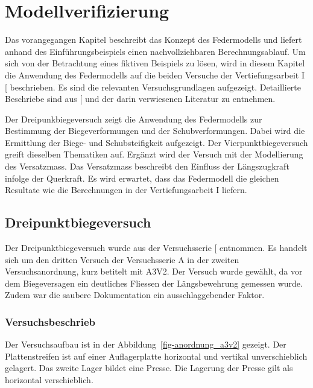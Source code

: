 \documentclass[
  11pt,
  letterpaper,
]{scrreprt}
\begin{document}

\chapter{Modellverifizierung}\label{sec-verifizierung}

Das vorangegangen Kapitel beschreibt das Konzept des Federmodells und
liefert anhand des Einführungsbeispiels einen nachvollziehbaren
Berechnungsablauf. Um sich von der Betrachtung eines fiktiven Beispiels
zu lösen, wird in diesem Kapitel die Anwendung des Federmodells auf die
beiden Versuche der Vertiefungsarbeit I
{[}\citeproc{ref-gitz_ansatze_2024}{1}{]} beschrieben. Es sind die
relevanten Versuchsgrundlagen aufgezeigt. Detaillierte Beschriebe sind
aus {[}\citeproc{ref-gitz_ansatze_2024}{1}{]} und der darin verwiesenen
Literatur zu entnehmen.

Der Dreipunkbiegeversuch zeigt die Anwendung des Federmodells zur
Bestimmung der Biegeverformungen und der Schubverformungen. Dabei wird
die Ermittlung der Biege- und Schubsteifigkeit aufgezeigt. Der
Vierpunktbiegeversuch greift dieselben Thematiken auf. Ergänzt wird der
Versuch mit der Modellierung des Versatzmass. Das Versatzmass beschreibt
den Einfluss der Längszugkraft infolge der Querkraft. Es wird erwartet,
dass das Federmodell die gleichen Resultate wie die Berechnungen in der
Vertiefungsarbeit I liefern.

\section{Dreipunktbiegeversuch}\label{dreipunktbiegeversuch}

Der Dreipunktbiegeversuch wurde aus der Versuchsserie
{[}\citeproc{ref-jager_versuche_2006}{2}{]} entnommen. Es handelt sich
um den dritten Versuch der Versuchsserie A in der zweiten
Versuchsanordnung, kurz betitelt mit A3V2. Der Versuch wurde gewählt, da
vor dem Biegeversagen ein deutliches Fliessen der Längsbewehrung
gemessen wurde. Zudem war die saubere Dokumentation ein
ausschlaggebender Faktor.

\subsection{Versuchsbeschrieb}\label{versuchsbeschrieb}

Der Versuchsaufbau ist in der Abbildung~\ref{fig-anordnung_a3v2}
gezeigt. Der Plattenstreifen ist auf einer Auflagerplatte horizontal und
vertikal unverschieblich gelagert. Das zweite Lager bildet eine Presse.
Die Lagerung der Presse gilt als horizontal verschieblich.
\end{document}
